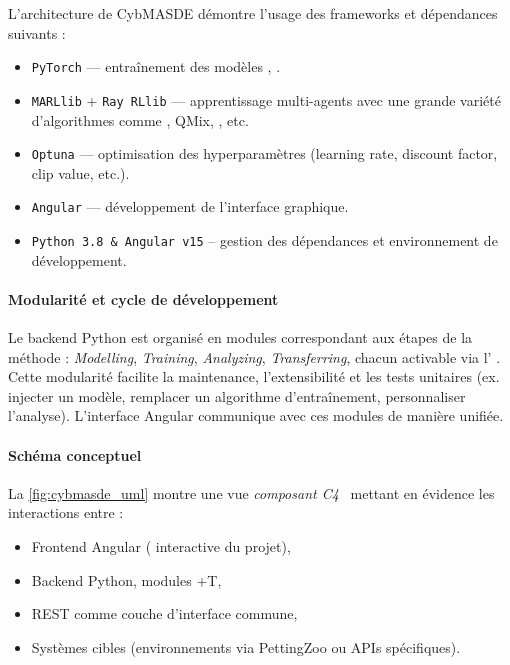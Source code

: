 L'architecture de CybMASDE démontre l'usage des frameworks et dépendances suivants :
\begin{itemize}
  \item \texttt{PyTorch} — entraînement des modèles , .
  \item \texttt{MARLlib} + \texttt{Ray RLlib} — apprentissage multi-agents avec une grande variété d'algorithmes comme , QMix, , etc.
  \item \texttt{Optuna} — optimisation des hyperparamètres (learning rate, discount factor,  clip value, etc.).
  \item \texttt{Angular} — développement de l'interface graphique.
  \item \texttt{Python 3.8 \& Angular v15} -- gestion des dépendances et environnement de développement.
\end{itemize}



\paragraph{Modularité et cycle de développement}
Le backend Python est organisé en modules correspondant aux étapes de la méthode  :
\textit{Modelling}, \textit{Training}, \textit{Analyzing}, \textit{Transferring}, chacun activable via l' .
Cette modularité facilite la maintenance, l'extensibilité et les tests unitaires (ex. injecter un modèle, remplacer un algorithme d'entraînement, personnaliser l'analyse). L'interface Angular communique avec ces modules de manière unifiée.

\paragraph{Schéma conceptuel}
La \autoref{fig:cybmasde_uml} montre une vue \textit{composant C4}~\cite{richards2019fundamentals} mettant en évidence les interactions entre :
\begin{itemize}
  \item \textsf{Frontend Angular} ( interactive du projet),
  \item \textsf{Backend Python}, modules +T,
  \item \textsf{ REST} comme couche d'interface commune,
  \item \textsf{Systèmes cibles} (environnements via PettingZoo ou APIs spécifiques).
\end{itemize}

